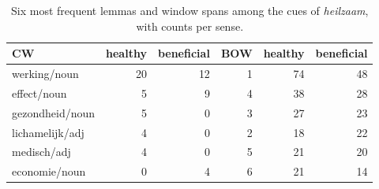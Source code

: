 \documentclass[
]{book}
\begin{document}
\begin{table}

\caption{\label{tab:heilzaamdep}Four most frequent dependency paths among the cues of \emph{heilzaam}, with counts per sense. \texttt{NA} indicates that the cue is not in the sentence of the target. In the path, \texttt{CW} stands for the cue and \texttt{T} stands for the target: the head is at the left of \(\rightarrow\) and its dependents are to the right, preceded by the name of the dependency relation.}
\centering
{}
\end{table}



\begin{table}

\caption{\label{tab:heilzaamcues}Six most frequent lemmas and window spans among the cues of \emph{heilzaam}, with counts per sense.}
\centering
\begin{tabular}[t]{lr>{}r|rrr}
\toprule
CW & healthy & beneficial & BOW & healthy & beneficial\\
\midrule
werking/noun & 20 & 12 & 1 & 74 & 48\\
effect/noun & 5 & 9 & 4 & 38 & 28\\
gezondheid/noun & 5 & 0 & 3 & 27 & 23\\
lichamelijk/adj & 4 & 0 & 2 & 18 & 22\\
medisch/adj & 4 & 0 & 5 & 21 & 20\\
\addlinespace
economie/noun & 0 & 4 & 6 & 21 & 14\\
\bottomrule
\end{tabular}
\end{table}
\end{document}
